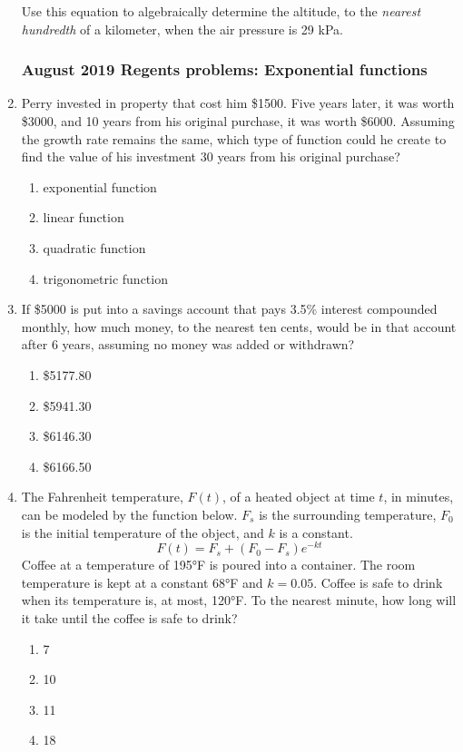 \documentclass[12pt, twoside]{article}
\begin{document}
\begin{enumerate}[itemsep=0.5cm]
Use this equation to algebraically determine the altitude, to the \emph{nearest hundredth} of a kilometer, when the air pressure is 29 kPa.

\newpage
\subsubsection*{August 2019 Regents problems: Exponential functions}

\item Perry invested in property that cost him \$1500. Five years later, it was worth \$3000, and 10 years from his original purchase, it was worth \$6000. Assuming the growth rate remains the same, which type of function could he create to find the value of his investment 30 years from his original purchase?
\begin{enumerate}
    \item exponential function
    \item linear function
    \item quadratic function
    \item trigonometric function
\end{enumerate}

\item If \$5000 is put into a savings account that pays 3.5\% interest compounded monthly, how much money, to the nearest ten cents, would be in that account after 6 years, assuming no money was added or withdrawn?
\begin{enumerate}
    \item \$5177.80
    \item \$5941.30
    \item \$6146.30
    \item \$6166.50
\end{enumerate}

\item The Fahrenheit temperature, $F(t)$, of a heated object at time $t$, in minutes, can be modeled by the function below. $F_s$ is the surrounding temperature, $F_0$ is the initial temperature of the object, and $k$ is a constant.
\[ F(t) = F_s + (F_0 - F_s)e^{-kt} \]
Coffee at a temperature of 195°F is poured into a container. The room temperature is kept at a constant 68°F and $k = 0.05$. Coffee is safe to drink when its temperature is, at most, 120°F. To the nearest minute, how long will it take until the coffee is safe to drink?
\begin{enumerate}
    \item 7
    \item 10
    \item 11
    \item 18
\end{enumerate}


\end{enumerate}
\end{document}
